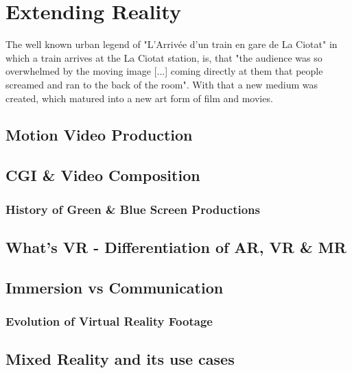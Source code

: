 %
\chapter{Extending Reality}
\label{sec:extendingreality}


The well known urban legend of "L'Arriv\'ee d'un train en gare de La Ciotat" in 
which a train arrives at the La Ciotat station, is, that "the audience was so 
overwhelmed by the moving image [...] coming directly at them that people 
screamed and ran to the back of the room". \cite{wiki:train:2017} With that a 
new medium was created, which matured into a new art form of film and movies.

\section{Motion Video Production}

\section{CGI \& Video Composition}

\subsection{History of Green \& Blue Screen Productions}

\section{What's VR - Differentiation of AR, VR \& MR}

\section{Immersion vs Communication}

\subsection{Evolution of Virtual Reality Footage}

\section{Mixed Reality and its use cases}



